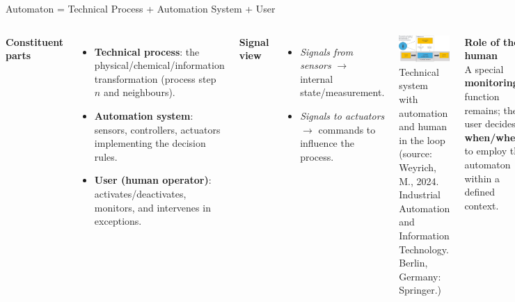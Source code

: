 \begin{frame}{Automaton = Technical Process + Automation System + User}
\begin{columns}[T,onlytextwidth]
\textbf{Constituent parts}
\begin{itemize}
  \item \textbf{Technical process}: the physical/chemical/information transformation (process step $n$ and neighbours).
  \item \textbf{Automation system}: sensors, controllers, actuators implementing the decision rules.
  \item \textbf{User (human operator)}: activates/deactivates, monitors, and intervenes in exceptions.
\end{itemize}

\textbf{Signal view}
\begin{itemize}
  \item \emph{Signals from sensors} $\rightarrow$ internal state/measurement.
  \item \emph{Signals to actuators} $\rightarrow$ commands to influence the process.
\end{itemize}

\includegraphics[width=\linewidth]{fig/lec01/automation_human_user.pdf}\\
\footnotesize{Technical system with automation and human in the loop (source: Weyrich, M., 2024. Industrial Automation and Information Technology. Berlin, Germany: Springer.)}

\textbf{Role of the human}\\
A special \textbf{monitoring} function remains; the user decides \textbf{when/where} to employ the automaton within a defined context.
\end{columns}
\end{frame}

